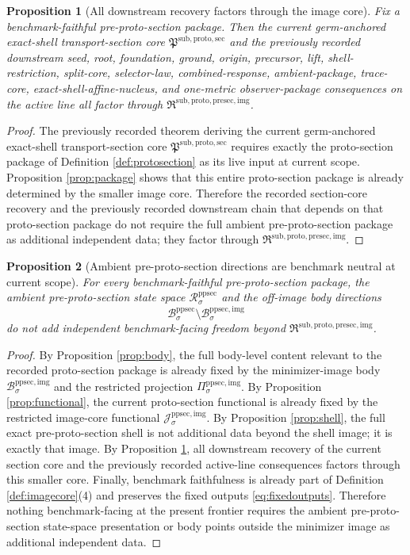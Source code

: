 \documentclass[11pt]{article}
\newcommand{\ProtoSectionCore}{\mathfrak P^{\mathrm{sub,proto,sec}}}
\newcommand{\PreProtoSectionState}[1]{\mathcal R_{#1}^{\mathrm{ppsec}}}
\newcommand{\PreProtoSectionBody}[1]{\mathcal B_{#1}^{\mathrm{ppsec}}}
\newcommand{\PreProtoSectionImageCore}{\mathfrak R^{\mathrm{sub,proto,presec,img}}}
\newcommand{\PreProtoSectionImgBody}[1]{\mathcal B_{#1}^{\mathrm{ppsec,img}}}
\newcommand{\PreProtoSectionImgProj}[1]{\Pi_{#1}^{\mathrm{ppsec,img}}}
\newcommand{\PreProtoSectionImgFunctional}[1]{\mathscr J_{#1}^{\mathrm{ppsec,img}}}
\newtheorem{proposition}{Proposition}
\begin{document}
\begin{proposition}[All downstream recovery factors through the image core]
\label{prop:downstream}
Fix a benchmark-faithful pre-proto-section package. Then the current germ-anchored exact-shell transport-section core \(\ProtoSectionCore\) and the previously recorded downstream seed, root, foundation, ground, origin, precursor, lift, shell-restriction, split-core, selector-law, combined-response, ambient-package, trace-core, exact-shell-affine-nucleus, and one-metric observer-package consequences on the active line all factor through \(\PreProtoSectionImageCore\).
\end{proposition}

\begin{proof}
The previously recorded theorem deriving the current germ-anchored exact-shell transport-section core \(\ProtoSectionCore\) requires exactly the proto-section package of Definition \ref{def:protosection} as its live input at current scope. Proposition \ref{prop:package} shows that this entire proto-section package is already determined by the smaller image core. Therefore the recorded section-core recovery and the previously recorded downstream chain that depends on that proto-section package do not require the full ambient pre-proto-section package as additional independent data; they factor through \(\PreProtoSectionImageCore\).
\end{proof}

\begin{proposition}[Ambient pre-proto-section directions are benchmark neutral at current scope]
\label{prop:neutral}
For every benchmark-faithful pre-proto-section package, the ambient pre-proto-section state space \(\PreProtoSectionState{\sigma}\) and the off-image body directions
\[
\PreProtoSectionBody{\sigma}\setminus\PreProtoSectionImgBody{\sigma}
\]
do not add independent benchmark-facing freedom beyond \(\PreProtoSectionImageCore\).
\end{proposition}

\begin{proof}
By Proposition \ref{prop:body}, the full body-level content relevant to the recorded proto-section package is already fixed by the minimizer-image body \(\PreProtoSectionImgBody{\sigma}\) and the restricted projection \(\PreProtoSectionImgProj{\sigma}\). By Proposition \ref{prop:functional}, the current proto-section functional is already fixed by the restricted image-core functional \(\PreProtoSectionImgFunctional{\sigma}\). By Proposition \ref{prop:shell}, the full exact pre-proto-section shell is not additional data beyond the shell image; it is exactly that image. By Proposition \ref{prop:downstream}, all downstream recovery of the current section core and the previously recorded active-line consequences factors through this smaller core. Finally, benchmark faithfulness is already part of Definition \ref{def:imagecore}(4) and preserves the fixed outputs \eqref{eq:fixedoutputs}. Therefore nothing benchmark-facing at the present frontier requires the ambient pre-proto-section state-space presentation or body points outside the minimizer image as additional independent data.
\end{proof}
\end{document}
